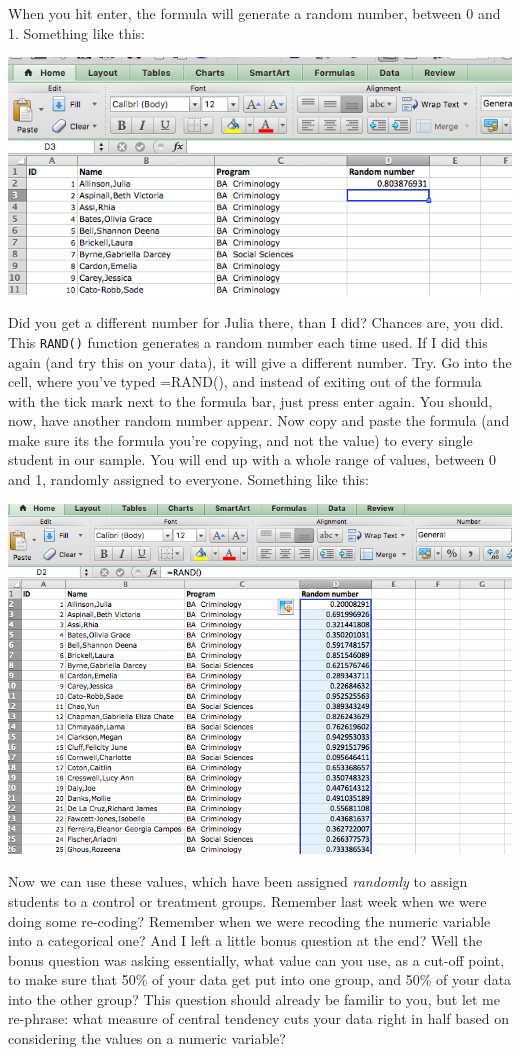 \documentclass[]{book}
\theoremstyle{definition}
\theoremstyle{definition}
\theoremstyle{definition}
\theoremstyle{remark}
\begin{document}
When you hit enter, the formula will generate a random number, between 0
and 1. Something like this:

\includegraphics{imgs/first_rand.png}

Did you get a different number for Julia there, than I did? Chances are,
you did. This \texttt{RAND()} function generates a random number each
time used. If I did this again (and try this on your data), it will give
a different number. Try. Go into the cell, where you've typed =RAND(),
and instead of exiting out of the formula with the tick mark next to the
formula bar, just press enter again. You should, now, have another
random number appear. Now copy and paste the formula (and make sure its
the formula you're copying, and not the value) to every single student
in our sample. You will end up with a whole range of values, between 0
and 1, randomly assigned to everyone. Something like this:

\includegraphics{imgs/rand_nums.png}

Now we can use these values, which have been assigned \emph{randomly} to
assign students to a control or treatment groups. Remember last week
when we were doing some re-coding? Remember when we were recoding the
numeric variable into a categorical one? And I left a little bonus
question at the end? Well the bonus question was asking essentially,
what value can you use, as a cut-off point, to make sure that 50\% of
your data get put into one group, and 50\% of your data into the other
group? This question should already be familir to you, but let me
re-phrase: what measure of central tendency cuts your data right in half
based on considering the values on a numeric variable?
\end{document}
